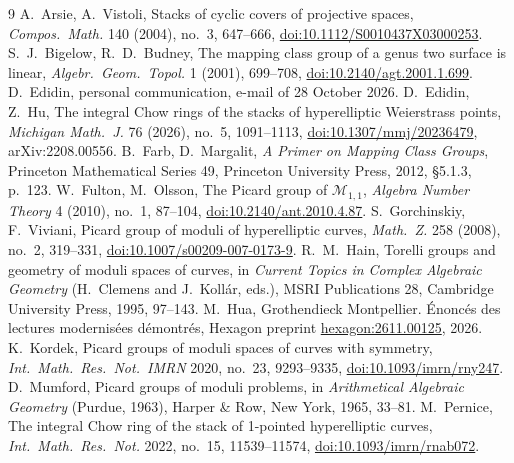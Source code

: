 \documentclass[11pt,a4paper]{amsart}
\theoremstyle{remark}
\begin{document}
\begin{thebibliography}{9}
 A.~Arsie, A.~Vistoli, Stacks of cyclic covers of projective spaces, \emph{Compos.\ Math.} 140 (2004), no.~3, 647--666, \href{https://doi.org/10.1112/S0010437X03000253}{doi:10.1112/S0010437X03000253}.
 S.~J.~Bigelow, R.~D.~Budney, The mapping class group of a genus two surface is linear, \emph{Algebr.\ Geom.\ Topol.} 1 (2001), 699--708, \href{https://doi.org/10.2140/agt.2001.1.699}{doi:10.2140/agt.2001.1.699}.
 D.~Edidin, personal communication, e-mail of 28 October 2026.
 D.~Edidin, Z.~Hu, The integral Chow rings of the stacks of hyperelliptic Weierstrass points, \emph{Michigan Math.\ J.} 76 (2026), no.~5, 1091--1113, \href{https://doi.org/10.1307/mmj/20236479}{doi:10.1307/mmj/20236479}, arXiv:2208.00556.
 B.~Farb, D.~Margalit, \emph{A Primer on Mapping Class Groups}, Princeton Mathematical Series 49, Princeton University Press, 2012, \S5.1.3, p.~123.
 W.~Fulton, M.~Olsson, The Picard group of $\mathcal M_{1,1}$, \emph{Algebra Number Theory} 4 (2010), no.~1, 87--104, \href{https://doi.org/10.2140/ant.2010.4.87}{doi:10.2140/ant.2010.4.87}.
 S.~Gorchinskiy, F.~Viviani, Picard group of moduli of hyperelliptic curves, \emph{Math.\ Z.} 258 (2008), no.~2, 319--331, \href{https://doi.org/10.1007/s00209-007-0173-9}{doi:10.1007/s00209-007-0173-9}.
 R.~M.~Hain, Torelli groups and geometry of moduli spaces of curves, in \emph{Current Topics in Complex Algebraic Geometry} (H.~Clemens and J.~Koll\'ar, eds.), MSRI Publications 28, Cambridge University Press, 1995, 97--143.
 M.~Hua, Grothendieck Montpellier. Énoncés des lectures modernisées démontrés, Hexagon preprint \href{https://hexagonmath.org/2611.00125}{hexagon:2611.00125}, 2026.
 K.~Kordek, Picard groups of moduli spaces of curves with symmetry, \emph{Int.\ Math.\ Res.\ Not.\ IMRN} 2020, no.~23, 9293--9335, \href{https://doi.org/10.1093/imrn/rny247}{doi:10.1093/imrn/rny247}.
 D.~Mumford, Picard groups of moduli problems, in \emph{Arithmetical Algebraic Geometry} (Purdue, 1963), Harper \& Row, New York, 1965, 33--81.
 M.~Pernice, The integral Chow ring of the stack of 1-pointed hyperelliptic curves, \emph{Int.\ Math.\ Res.\ Not.} 2022, no.~15, 11539--11574, \href{https://doi.org/10.1093/imrn/rnab072}{doi:10.1093/imrn/rnab072}.
\end{thebibliography}
\end{document}

